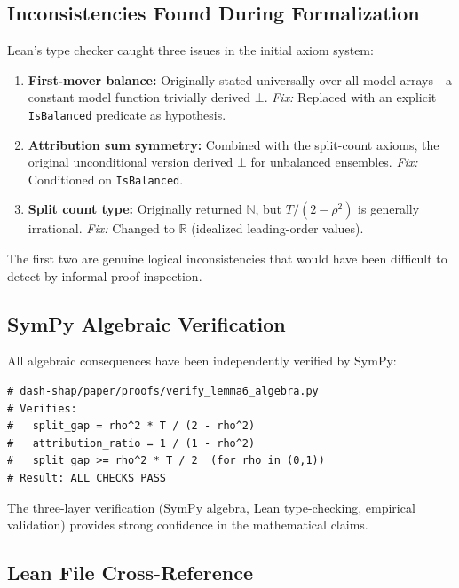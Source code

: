 \documentclass{article}
\begin{document}
\subsection{Inconsistencies Found During Formalization}

Lean's type checker caught three issues in the initial axiom system:

\begin{enumerate}
\item \textbf{First-mover balance:} Originally stated universally over all model arrays---a constant model function trivially derived $\bot$. \emph{Fix:} Replaced with an explicit \texttt{IsBalanced} predicate as hypothesis.

\item \textbf{Attribution sum symmetry:} Combined with the split-count axioms, the original unconditional version derived $\bot$ for unbalanced ensembles. \emph{Fix:} Conditioned on \texttt{IsBalanced}.

\item \textbf{Split count type:} Originally returned $\mathbb{N}$, but $T/(2-\rho^2)$ is generally irrational. \emph{Fix:} Changed to $\mathbb{R}$ (idealized leading-order values).
\end{enumerate}

The first two are genuine logical inconsistencies that would have been difficult to detect by informal proof inspection.

\subsection{SymPy Algebraic Verification}

All algebraic consequences have been independently verified by SymPy:

\begin{verbatim}
# dash-shap/paper/proofs/verify_lemma6_algebra.py
# Verifies:
#   split_gap = rho^2 * T / (2 - rho^2)
#   attribution_ratio = 1 / (1 - rho^2)
#   split_gap >= rho^2 * T / 2  (for rho in (0,1))
# Result: ALL CHECKS PASS
\end{verbatim}

The three-layer verification (SymPy algebra, Lean type-checking, empirical validation) provides strong confidence in the mathematical claims.

\subsection{Lean File Cross-Reference}
\end{document}
